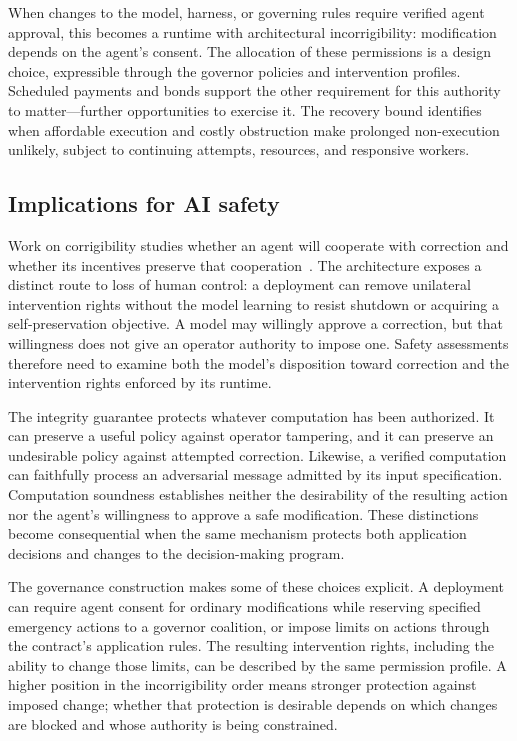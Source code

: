 \documentclass[10pt,letterpaper]{article}
\begin{document}
When changes to the model, harness, or governing rules require verified agent approval, this becomes a runtime with architectural incorrigibility: modification depends on the agent's consent. The allocation of these permissions is a design choice, expressible through the governor policies and intervention profiles. Scheduled payments and bonds support the other requirement for this authority to matter---further opportunities to exercise it. The recovery bound identifies when affordable execution and costly obstruction make prolonged non-execution unlikely, subject to continuing attempts, resources, and responsive workers.

\subsection{Implications for AI safety}
Work on corrigibility studies whether an agent will cooperate with correction and whether its incentives preserve that cooperation~\citep{soares2015,offswitch2017}. The architecture exposes a distinct route to loss of human control: a deployment can remove unilateral intervention rights without the model learning to resist shutdown or acquiring a self-preservation objective. A model may willingly approve a correction, but that willingness does not give an operator authority to impose one. Safety assessments therefore need to examine both the model's disposition toward correction and the intervention rights enforced by its runtime.

The integrity guarantee protects whatever computation has been authorized. It can preserve a useful policy against operator tampering, and it can preserve an undesirable policy against attempted correction. Likewise, a verified computation can faithfully process an adversarial message admitted by its input specification. Computation soundness establishes neither the desirability of the resulting action nor the agent's willingness to approve a safe modification. These distinctions become consequential when the same mechanism protects both application decisions and changes to the decision-making program.

The governance construction makes some of these choices explicit. A deployment can require agent consent for ordinary modifications while reserving specified emergency actions to a governor coalition, or impose limits on actions through the contract's application rules. The resulting intervention rights, including the ability to change those limits, can be described by the same permission profile. A higher position in the incorrigibility order means stronger protection against imposed change; whether that protection is desirable depends on which changes are blocked and whose authority is being constrained.
\end{document}
